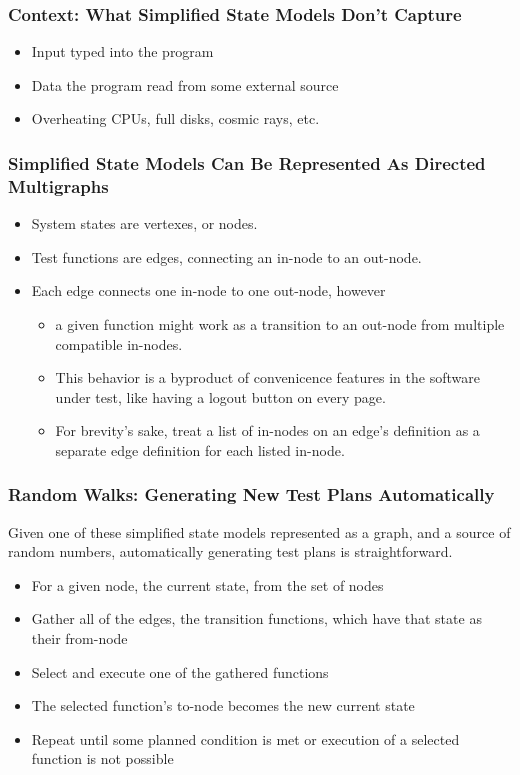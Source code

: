 \begin{frame}
  \frametitle{Context: What Simplified State Models Don't Capture}
  \begin{itemize}
    \item Input typed into the program
    \item Data the program read from some external source
    \item Overheating CPUs, full disks, cosmic rays, etc.
  \end{itemize}
\end{frame}

\begin{frame}
  \frametitle{Simplified State Models Can Be Represented As Directed Multigraphs}
  \begin{itemize}
    \item System states are vertexes, or nodes.
    \item Test functions are edges, connecting an in-node to an out-node.
    \item Each edge connects one in-node to one out-node, however
    \begin{itemize}
      \item a given function might work as a transition to an out-node from multiple compatible in-nodes.
      \item This behavior is a byproduct of convenicence features in the software under test, like having a logout button on every page.
      \item For brevity's sake, treat a list of in-nodes on an edge's definition as a separate edge definition for each listed in-node.
    \end{itemize}
  \end{itemize}
\end{frame}

\begin{frame}
  \frametitle{Random Walks: Generating New Test Plans Automatically}
  Given one of these simplified state models represented as a graph, and a source of random numbers, automatically generating test plans is straightforward.
  \begin{itemize}
    \item For a given node, the current state, from the set of nodes
    \item Gather all of the edges, the transition functions, which have that state as their from-node
    \item Select and execute one of the gathered functions
    \item The selected function's to-node becomes the new current state
    \item Repeat until some planned condition is met or execution of a selected function is not possible
  \end{itemize}
\end{frame}

